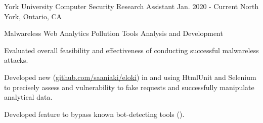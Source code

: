 

\begin{cventries}

  \cventry
    {York University} %
    {Computer Security Research Assistant} %
    {Jan. 2020 - Current} %
    {North York, Ontario, CA} %
    {
      \begin{cvitems} %
        \item {Malwareless Web Analytics Pollution Tools Analysis and Development}
          \begin{cvsubitems}
            \item {Evaluated overall feasibility and effectiveness of conducting successful malwareless attacks.}
            \item {Developed new  (\underline{\href{https://github.com/saaniaki/eloki}{github.com/saaniaki/eloki}}) in  and  using HtmlUnit and Selenium to precisely assess  and  vulnerability to fake requests and successfully manipulate analytical data.}
            \item {Developed feature to bypass known bot-detecting tools ().}
          \end{cvsubitems}
      \end{cvitems}
    }


\end{cventries}

